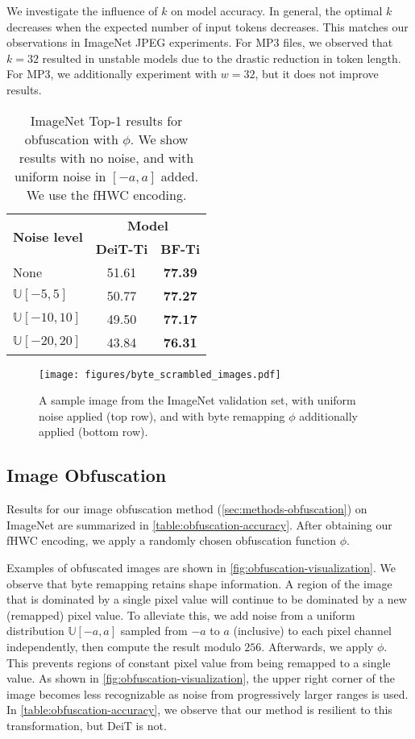We investigate the influence of $k$ on model accuracy. In general, the optimal $k$ decreases when the expected number of input tokens decreases. This matches our observations in ImageNet JPEG experiments. For MP3 files, we observed that $k=32$ resulted in unstable models due to the drastic reduction in token length. For MP3, we additionally experiment with $w=32$, but it does not improve results.

\begin{table}
\centering
\begin{tabular}{lcc}
    \toprule[1.5pt]
    \multirow{2}{*}{\textbf{Noise level}} &  \multicolumn{2}{c}{\textbf{Model}} \\
    \cmidrule[1.25pt]{2-3}
    & \textbf{DeiT-Ti} & \textbf{BF-Ti} \\
    \midrule[1.25pt]
    None & 51.61 & \textbf{77.39} \\
    $\mathbb{U}[-5, 5]$ & 50.77 & \textbf{77.27} \\
    $\mathbb{U}[-10, 10]$ & 49.50 & \textbf{77.17} \\
    $\mathbb{U}[-20, 20]$ & 43.84 & \textbf{76.31} \\
    \bottomrule[1.5pt]
\end{tabular}
\caption{
ImageNet Top-1 results for obfuscation with $\phi$. We show results with no noise, and with uniform noise in $[-a, a]$ added. We use the fHWC encoding.
}
\label{table:obfuscation-accuracy}
\end{table}

\begin{figure}
    \centering
    \texttt{[image: figures/byte\_scrambled\_images.pdf]}
    \caption{
        A sample image from the ImageNet validation set, with uniform noise applied (top row), and with byte remapping $\phi$ additionally applied (bottom row).
    }
    \label{fig:obfuscation-visualization}
\end{figure}

\subsection{Image Obfuscation}
Results for our image obfuscation method (\autoref{sec:methods-obfuscation}) on ImageNet are summarized in \autoref{table:obfuscation-accuracy}. After obtaining our fHWC encoding, we apply a randomly chosen obfuscation function $\phi$.

Examples of obfuscated images are shown in \autoref{fig:obfuscation-visualization}. We observe that byte remapping retains shape information. A region of the image that is dominated by a single pixel value will continue to be dominated by a new (remapped) pixel value. To alleviate this, we add noise from a uniform distribution $\mathbb{U}[-a, a]$ sampled from $-a$ to $a$ (inclusive) to each pixel channel independently, then compute the result modulo $256$. Afterwards, we apply $\phi$. This prevents regions of constant pixel value from being remapped to a single value. As shown in \autoref{fig:obfuscation-visualization}, the upper right corner of the image becomes less recognizable as noise from progressively larger ranges is used. In \autoref{table:obfuscation-accuracy}, we observe that our method is resilient to this transformation, but DeiT is not.

